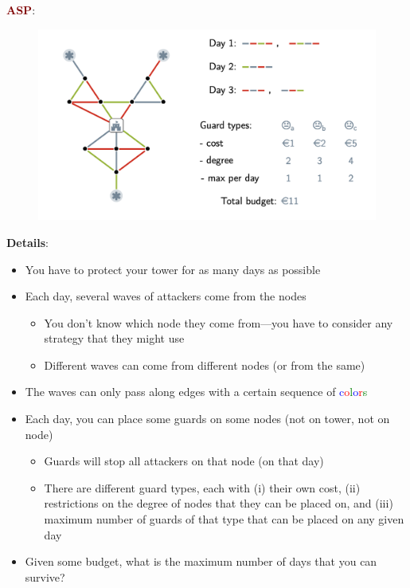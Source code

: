 {\Huge \textbf{\textcolor{Maroon}{ASP}}:} 
\begin{figure}[ht!]
    \includegraphics[scale=0.65]{figures/towerdef.png}
\end{figure}

\textbf{Details}: 
\begin{itemize}
    \setlength\itemsep{0em}
    \item You have to protect your tower for as many days as possible
    \item Each day, several waves of attackers come from the nodes
    \begin{itemize}
        \setlength\itemsep{0em}
        \item You don’t know which node they come from—you have to consider any strategy that they might use 
        \item Different waves can come from different nodes (or from the same)
    \end{itemize}
    \item The waves can only pass along edges with a certain sequence of \textcolor{Blue}{c}\textcolor{Red}{o}\textcolor{Green}{l}\textcolor{Blue}{o}\textcolor{Red}{r}\textcolor{Green}{s}
    \item Each day, you can place some guards on some nodes (not on tower, not on node)
    \begin{itemize}
        \setlength\itemsep{0em}
        \item Guards will stop all attackers on that node (on that day)
        \item There are different guard types, each with (i) their own cost, (ii) restrictions on the degree of nodes that they can be placed on, and (iii) maximum number of guards of that type that can be placed on any given day
    \end{itemize}
    \item Given some budget, what is the maximum number of days that you can survive?
\end{itemize}

